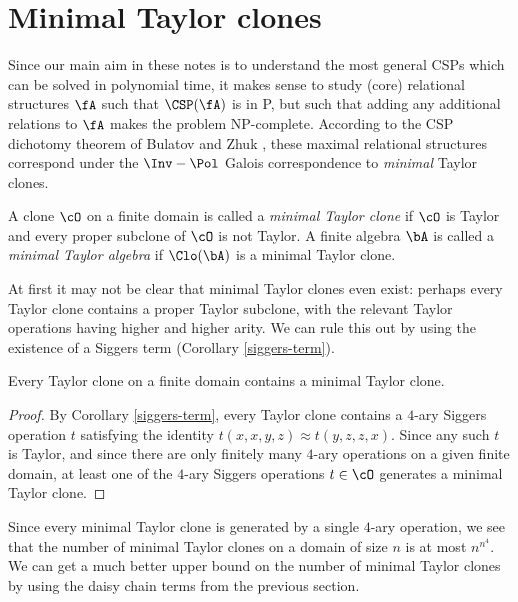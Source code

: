 


\section{Minimal Taylor clones}

Since our main aim in these notes is to understand the most general CSPs which can be solved in polynomial time, it makes sense to study (core) relational structures $\fA$ such that $\CSP(\fA)$ is in P, but such that adding any additional relations to $\fA$ makes the problem NP-complete. According to the CSP dichotomy theorem of Bulatov \cite{bulatov-dichotomy} and Zhuk \cite{zhuk-dichotomy}, these maximal relational structures correspond under the $\Inv-\Pol$ Galois correspondence to \emph{minimal} Taylor clones.

\begin{defn} A clone $\cO$ on a finite domain is called a \emph{minimal Taylor clone} if $\cO$ is Taylor and every proper subclone of $\cO$ is not Taylor. A finite algebra $\bA$ is called a \emph{minimal Taylor algebra} if $\Clo(\bA)$ is a minimal Taylor clone.
\end{defn}

At first it may not be clear that minimal Taylor clones even exist: perhaps every Taylor clone contains a proper Taylor subclone, with the relevant Taylor operations having higher and higher arity. We can rule this out by using the existence of a Siggers term (Corollary \ref{siggers-term}).

\begin{prop} Every Taylor clone on a finite domain contains a minimal Taylor clone.
\end{prop}
\begin{proof} By Corollary \ref{siggers-term}, every Taylor clone contains a $4$-ary Siggers operation $t$ satisfying the identity $t(x,x,y,z) \approx t(y,z,z,x)$. Since any such $t$ is Taylor, and since there are only finitely many $4$-ary operations on a given finite domain, at least one of the $4$-ary Siggers operations $t \in \cO$ generates a minimal Taylor clone.
\end{proof}

Since every minimal Taylor clone is generated by a single $4$-ary operation, we see that the number of minimal Taylor clones on a domain of size $n$ is at most $n^{n^4}$. We can get a much better upper bound on the number of minimal Taylor clones by using the daisy chain terms from the previous section.

